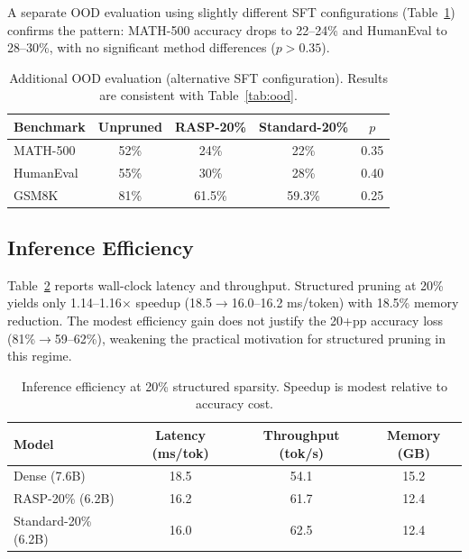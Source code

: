 \documentclass[11pt,a4paper]{article}
\begin{document}
A separate OOD evaluation using slightly different SFT configurations (Table~\ref{tab:ood2}) confirms the pattern: MATH-500 accuracy drops to 22--24\% and HumanEval to 28--30\%, with no significant method differences ($p > 0.35$).

\begin{table}[t]
\centering
\small
\caption{Additional OOD evaluation (alternative SFT configuration). Results are consistent with Table~\ref{tab:ood}.}
\label{tab:ood2}
\begin{tabular}{lcccc}
\toprule
\textbf{Benchmark} & \textbf{Unpruned} & \textbf{RASP-20\%} & \textbf{Standard-20\%} & $p$ \\
\midrule
MATH-500 & 52\% & 24\% & 22\% & 0.35 \\
HumanEval & 55\% & 30\% & 28\% & 0.40 \\
GSM8K & 81\% & 61.5\% & 59.3\% & 0.25 \\
\bottomrule
\end{tabular}
\end{table}

\subsection{Inference Efficiency}
\label{sec:efficiency}

Table~\ref{tab:efficiency} reports wall-clock latency and throughput. Structured pruning at 20\% yields only 1.14--1.16$\times$ speedup (18.5$\to$16.0--16.2 ms/token) with 18.5\% memory reduction. The modest efficiency gain does not justify the 20+pp accuracy loss (81\%$\to$59--62\%), weakening the practical motivation for structured pruning in this regime.

\begin{table}[t]
\centering
\small
\caption{Inference efficiency at 20\% structured sparsity. Speedup is modest relative to accuracy cost.}
\label{tab:efficiency}
\begin{tabular}{lccc}
\toprule
\textbf{Model} & \textbf{Latency (ms/tok)} & \textbf{Throughput (tok/s)} & \textbf{Memory (GB)} \\
\midrule
Dense (7.6B) & 18.5 & 54.1 & 15.2 \\
RASP-20\% (6.2B) & 16.2 & 61.7 & 12.4 \\
Standard-20\% (6.2B) & 16.0 & 62.5 & 12.4 \\
\bottomrule
\end{tabular}
\end{table}

\end{document}
